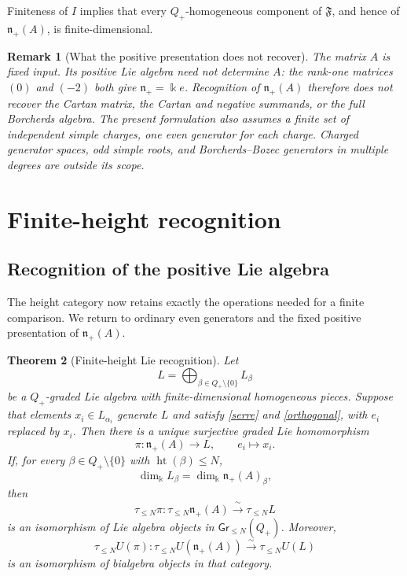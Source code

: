 \documentclass[11pt]{article}
\newtheorem{theorem}{Theorem}[section]
\newtheorem{remark}[theorem]{Remark}
\newcommand{\kk}{\Bbbk}
\newcommand{\htop}{\operatorname{ht}}
\begin{document}
Finiteness of $I$ implies that every $Q_+$-homogeneous component of
$\mathfrak F$, and hence of $\mathfrak n_+(A)$, is finite-dimensional.

\begin{remark}[What the positive presentation does not recover]
The matrix $A$ is fixed input.  Its positive Lie algebra need not determine
$A$: the rank-one matrices $(0)$ and $(-2)$ both give
$\mathfrak n_+=\kk e$.  Recognition of $\mathfrak n_+(A)$ therefore does
not recover the Cartan matrix, the Cartan and negative summands, or the full
Borcherds algebra.  The present formulation also assumes a finite set of
independent simple charges, one even generator for each charge.  Charged
generator spaces, odd simple roots, and Borcherds--Bozec generators in
multiple degrees are outside its scope.
\end{remark}

\section{Finite-height recognition}
\label{sec:finite-height}



\subsection{Recognition of the positive Lie algebra}

The height category now retains exactly the operations needed for a
finite comparison. We return to ordinary even generators and the fixed
positive presentation of $\mathfrak n_+(A)$.

\begin{theorem}[Finite-height Lie recognition]                \label{lie-recognition}
Let
\[
 L=\bigoplus_{\beta\in Q_+\setminus\{0\}}L_\beta
\]
be a $Q_+$-graded Lie algebra with finite-dimensional homogeneous pieces.
Suppose that elements $x_i\in L_{\alpha_i}$ generate $L$ and satisfy
\eqref{serre} and \eqref{orthogonal}, with $e_i$ replaced by $x_i$.
Then there is a unique surjective graded Lie homomorphism
\begin{equation}
 \pi:\mathfrak n_+(A)\longrightarrow L,\qquad e_i\longmapsto x_i.
                                                               \label{pi}
\end{equation}
If, for every $\beta\in Q_+\setminus\{0\}$ with
$\htop(\beta)\leq N$,
\begin{equation}
 \dim_\kk L_\beta=\dim_\kk\mathfrak n_+(A)_\beta,             \label{dimensions}
\end{equation}
then
\[
 \tau_{\leq N}\pi:\tau_{\leq N}\mathfrak n_+(A)
       \xrightarrow{\ \sim\ }\tau_{\leq N}L
\]
is an isomorphism of Lie algebra objects in
$\mathsf{Gr}_{\leq N}(Q_+)$.  Moreover,
\begin{equation}
 \tau_{\leq N}U(\pi):\tau_{\leq N}U(\mathfrak n_+(A))
       \xrightarrow{\ \sim\ }\tau_{\leq N}U(L)               \label{pbwiso}
\end{equation}
is an isomorphism of bialgebra objects in that category.
\end{theorem}
\end{document}
